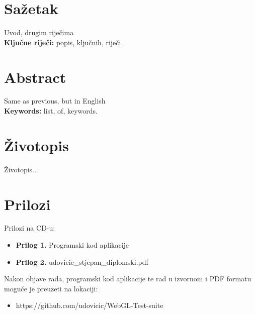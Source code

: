 \documentclass[a4paper,12pt]{extarticle}
\begin{document}
\section*{Sažetak}

Uvod, drugim riječima\\


{\bfseries Ključne riječi:} popis, ključnih, riječi.

\section*{Abstract}

Same as previous, but in English\\


{\bfseries Keywords:} list, of, keywords.

\section*{Životopis}

Životopis... %

\section*{Prilozi}

Prilozi na CD-u:

\begin{itemize}
\item \textbf{Prilog 1.} Programski kod aplikacije
\item \textbf{Prilog 2.} udovicic\_stjepan\_diplomski.pdf
\end{itemize}

Nakon  objave rada, programski kod aplikacije te rad u izvornom i PDF formatu moguće je preuzeti na lokaciji:

\begin{itemize}
\item https://github.com/udovicic/WebGL-Test-suite
\end{itemize}
\end{document}

